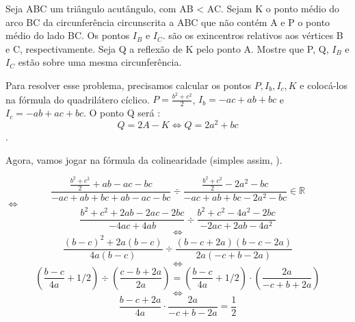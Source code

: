 \documentclass{article}
\begin{document}
\begin{tcolorbox}[colback=purple!5!white,colframe=purple!75!black,title=OBM N3 P2 2022\emoji{nerd-face}]
Seja ABC um triângulo acutângulo, com AB < AC. Sejam K o ponto médio do arco BC da
circunferência circunscrita a ABC que não contém A e P o ponto médio do lado BC. Os pontos $I_B$ e $I_C$.
são os exincentros relativos aos vértices B e C, respectivamente.
Seja Q a reflexão de K pelo ponto A. Mostre que P, Q, $I_B$ e $I_C$ estão sobre uma mesma circunferência.

\end{tcolorbox}
\begin{center}
\end{center}

Para resolver esse problema, precisamos calcular os pontos $P, I_b, I_c, K$ e colocá-los na fórmula do quadrilátero cíclico. $P = \frac{b^2+c^2}{2}$, $I_b = -ac + ab +  bc$ e $I_c = -ab + ac + bc$. O ponto Q será :
$$Q = 2A - K \iff Q = 2a^2 + bc$$.

Agora, vamos jogar na fórmula da colinearidade (simples assim, ).

$$\frac{\frac{b^2 + c^2}{2} + ab - ac - bc}{-ac + ab + bc + ab - ac - bc} \div \frac{\frac{b^2 + c^2}{2} - 2a^2 - bc}{-ac + ab + bc - 2a^2 - bc} \in \mathbb{R}$$
$\iff$
$$\frac{b^2 + c^2 + 2ab - 2ac - 2bc}{-4ac + 4ab} \div 
\frac{b^2 + c^2 - 4a^2 - 2bc}{-2ac + 2ab - 4a^2}
$$
$$\iff$$
$$
\frac{(b-c)^2 + 2a(b-c)}{4a(b-c)} \div \frac{(b - c + 2a)(b-c - 2a)}{2a(-c+b-2a)}
$$
$$\iff$$
$$
(\frac{b-c}{4a} + 1/2) \div (\frac{c-b + 2a}{2a}) = (\frac{b-c}{4a} + 1/2) \cdot (\frac{2a}{-c+b+2a})
$$
$$\iff$$
$$
\frac{b-c +2a}{4a} \cdot \frac{2a}{-c+b-2a} = \frac{1}{2}
$$
\end{document}
